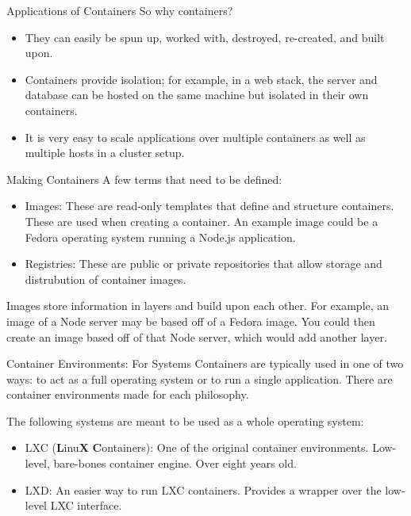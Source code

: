 \documentclass[xcolor=dvipsnames,aspectratio=1610]{beamer}
\begin{document}
  \begin{frame}{Applications of Containers}
    So why containers?

    \begin{itemize}
        \item They can easily be spun up, worked with, destroyed, re-created, and built upon.
        \item Containers provide isolation; for example, in a web stack, the server and database can be hosted on the same machine but isolated in their own containers.
        \item It is very easy to scale applications over multiple containers as well as multiple hosts in a cluster setup.
    \end{itemize}

    \vspace{10px}
  \end{frame}

  \begin{frame}{Making Containers}
      A few terms that need to be defined:
    \begin{itemize}
        \item \alert{Images}: These are read-only templates that define and structure containers. These are used when creating a container. An example image could be a Fedora operating system running a Node.js application.
        \item \alert{Registries}: These are public or private repositories that allow storage and distrubution of container images.
    \end{itemize}

    Images store information in layers and build upon each other. For example, an image of a Node server may be based off of a Fedora image. You could then create an image based off of that Node server, which would add another layer.

  \end{frame}

  \begin{frame}{Container Environments: For Systems}
      Containers are typically used in one of two ways: to act as a full operating system or to run a single application. There are container environments made for each philosophy. \newline

      The following systems are meant to be used as a whole operating system: \newline
      \begin{itemize}
          \setlength\itemsep{1.6em}
          \item \alert{LXC} (\textbf{L}inu\textbf{X} \textbf{C}ontainers): One of the original container environments. Low-level, bare-bones container engine. Over eight years old.
          \item \alert{LXD}: An easier way to run LXC containers. Provides a wrapper over the low-level LXC interface.
      \end{itemize}
  \end{frame}
\end{document}
